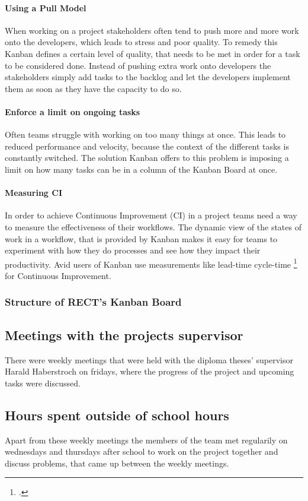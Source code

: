 \paragraph{Using a Pull Model}
When working on a project stakeholders often tend to push more and more work onto the developers, which leads to stress and poor quality. To remedy this Kanban defines a certain level of
quality, that needs to be met in order for a task to be considered done. Instead of pushing extra work onto developers the stakeholders simply add tasks to the backlog and let the 
developers implement them as soon as they have the capacity to do so.

\paragraph{Enforce a limit on ongoing tasks}
Often teams struggle with working on too many things at once. This leads to reduced performance and velocity, because the context of the different tasks is constantly switched. 
The solution Kanban offers to this problem is imposing a limit on how many tasks can be in a column of the Kanban Board at once. 

\paragraph{Measuring CI}
In order to achieve Continuous Improvement (CI) in a project teams need a way to measure the effectiveness of their workflows. The dynamic view of the states of work in a workflow, that is 
provided by Kanban makes it easy for teams to experiment with how they do processes and see how they impact their productivity. Avid users of Kanban use measurements like lead-time 
cycle-time \footcite{cycle-time-lead-time} for Continuous Improvement.  

\subsubsection{Structure of RECT's Kanban Board}

\subsection{Meetings with the projects supervisor}
There were weekly meetings that were held with the diploma theses' supervisor Harald Haberstroch on fridays, where the progress of the project and upcoming tasks were discussed.

\subsection{Hours spent outside of school hours} 
Apart from these weekly meetings the members of the team met regularily on wednesdays and thursdays after school to work on the project together and discuss problems, that came up between the weekly meetings.

